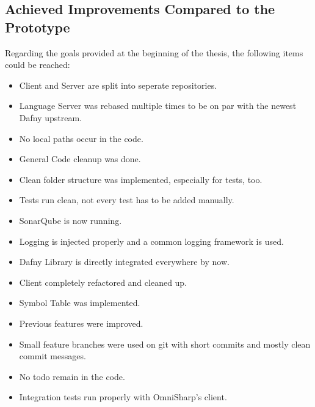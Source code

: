\subsection{Achieved Improvements Compared to the Prototype}
Regarding the goals provided at the beginning of the thesis, the following items could be reached:
\begin{itemize}
    \item Client and Server are split into seperate repositories.
    \item Language Server was rebased multiple times to be on par with the newest Dafny upstream.
    \item No local paths occur in the code.
    \item General Code cleanup was done.
    \item Clean folder structure was implemented, especially for tests, too.
    \item Tests run clean, not every test has to be added manually.
    \item SonarQube is now running.
    \item Logging is injected properly and a common logging framework is used.
    \item Dafny Library is directly integrated everywhere by now.
    \item Client completely refactored and cleaned up.
    \item Symbol Table was implemented.
    \item Previous features were improved.
    \item Small feature branches were used on git with short commits and mostly clean commit messages.
    \item No todo remain in the code.
    \item Integration tests run properly with OmniSharp's client.
\end{itemize}
